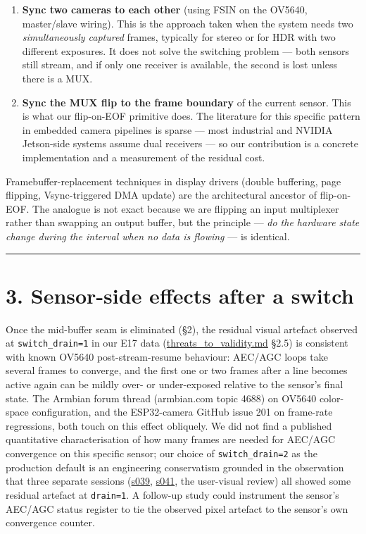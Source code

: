 \begin{enumerate}
\def\labelenumi{\arabic{enumi}.}
\tightlist
\item
  \textbf{Sync two cameras to each other} (using FSIN on the OV5640,
  master/slave wiring). This is the approach taken when the system needs
  two \emph{simultaneously captured} frames, typically for stereo or for
  HDR with two different exposures. It does not solve the switching
  problem --- both sensors still stream, and if only one receiver is
  available, the second is lost unless there is a MUX.
\item
  \textbf{Sync the MUX flip to the frame boundary} of the current
  sensor. This is what our flip-on-EOF primitive does. The literature
  for this specific pattern in embedded camera pipelines is sparse ---
  most industrial and NVIDIA Jetson-side systems assume dual receivers
  --- so our contribution is a concrete implementation and a measurement
  of the residual cost.
\end{enumerate}

Framebuffer-replacement techniques in display drivers (double buffering,
page flipping, Vsync-triggered DMA update) are the architectural
ancestor of flip-on-EOF. The analogue is not exact because we are
flipping an input multiplexer rather than swapping an output buffer, but
the principle --- \emph{do the hardware state change during the interval
when no data is flowing} --- is identical.

\begin{center}\rule{0.5\linewidth}{0.5pt}\end{center}

\section{3. Sensor-side effects after a
switch}\label{sensor-side-effects-after-a-switch}

Once the mid-buffer seam is eliminated (§2), the residual visual
artefact observed at \texttt{switch\_drain=1} in our E17 data
(\url{threats_to_validity.md} §2.5) is consistent with known OV5640
post-stream-resume behaviour: AEC/AGC loops take several frames to
converge, and the first one or two frames after a line becomes active
again can be mildly over- or under-exposed relative to the sensor's
final state. The Armbian forum thread (armbian.com topic 4688) on OV5640
color-space configuration, and the ESP32-camera GitHub issue 201 on
frame-rate regressions, both touch on this effect obliquely. We did not
find a published quantitative characterisation of how many frames are
needed for AEC/AGC convergence on this specific sensor; our choice of
\texttt{switch\_drain=2} as the production default is an engineering
conservatism grounded in the observation that three separate sessions
(\href{../experiments/s039_e17_drain_ab/}{s039},
\href{../experiments/s041_e17_eof_check/}{s041}, the user-visual review)
all showed some residual artefact at \texttt{drain=1}. A follow-up study
could instrument the sensor's AEC/AGC status register to tie the
observed pixel artefact to the sensor's own convergence counter.

